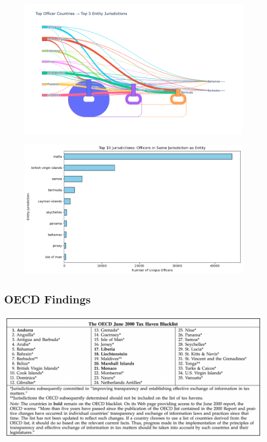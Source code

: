 \documentclass{article}
\begin{document}
\begin{figure}[H]
  \centering
    \caption{} 
  \label{fig:fig4}
  \includegraphics[width=\textwidth]{Figure 4.png}
\end{figure}

\begin{figure}[H]
  \centering
    \caption{} 
  \label{fig:fig5}
  \includegraphics[width=\textwidth]{Figure 5.png}
\end{figure}

\subsection{OECD Findings}

\begin{table}[H]
  \centering
  \caption{} 
  \label{fig:table2}
  \includegraphics[width=\textwidth]{Table 2.png}
\end{table}
\end{document}
